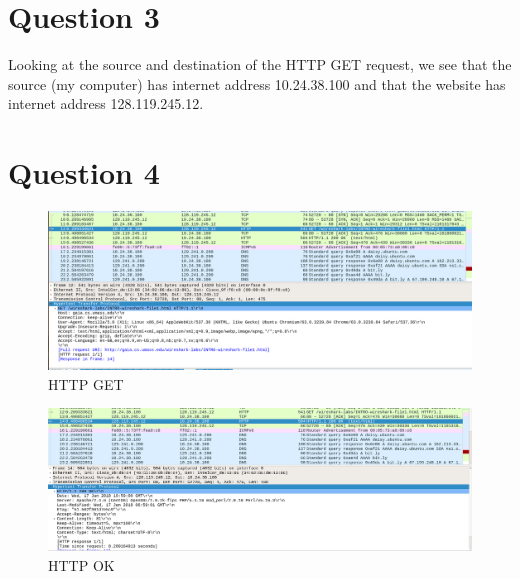 \documentclass{article}
\begin{document}
\section*{Question 3}
Looking at the source and destination of the HTTP GET request, we see that the source (my computer) has internet address 10.24.38.100 and that the website has internet address 128.119.245.12.


\section*{Question 4}
\begin{figure}[h]
    \includegraphics[width=\linewidth]{wireshark-intro-httpget.png}
    \caption{HTTP GET}
\end{figure}
\begin{figure}[h]
    \includegraphics[width=\linewidth]{wireshark-intro-httpok.png}
    \caption{HTTP OK}
\end{figure}
\end{document}
